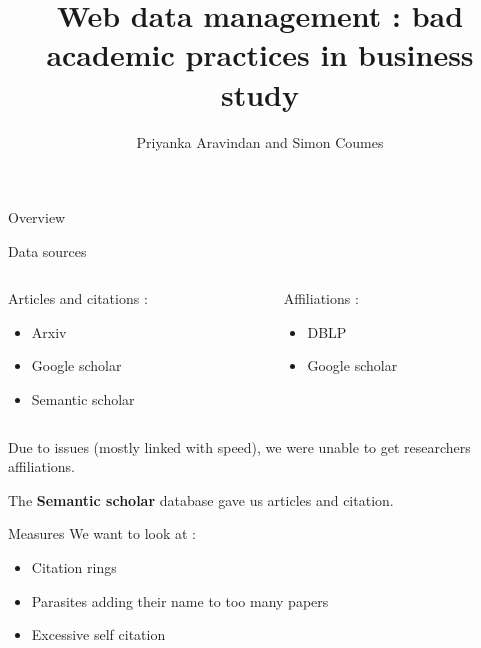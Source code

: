 \documentclass[10pt]{beamer}
\title{Web data management : bad academic practices in business study}
\author{Priyanka Aravindan and Simon Coumes}
\date{}
\begin{document}
\begin{frame}
\titlepage
\end{frame}

\begin{frame}{Overview}
  
  \end{frame}

\begin{frame}{Data sources}
    \begin{columns}
    \begin{column}{0.5\textwidth}
   	Articles and citations : 
	\begin{itemize}
	  \item Arxiv
	  \item Google scholar
	  \item Semantic scholar
	\end{itemize}
    \end{column}
    \begin{column}{0.5\textwidth}  %
      	Affiliations : 
        \begin{itemize}
       	  \item DBLP
	  \item Google scholar
	\end{itemize}
        \end{column}
    \end{columns}

    \vspace{1cm}

    Due to issues (mostly linked with speed), we were unable to get researchers affiliations.

    \vspace{0.75cm}

    The \textbf{Semantic scholar} database gave us articles and citation.
  \end{frame}


\begin{frame}{Measures}
  We want to look at :
  \begin{itemize}
    \item Citation rings
    \item Parasites adding their name to too many papers
    \item Excessive self citation
  \end{itemize}
  \end{frame}
\end{document}
